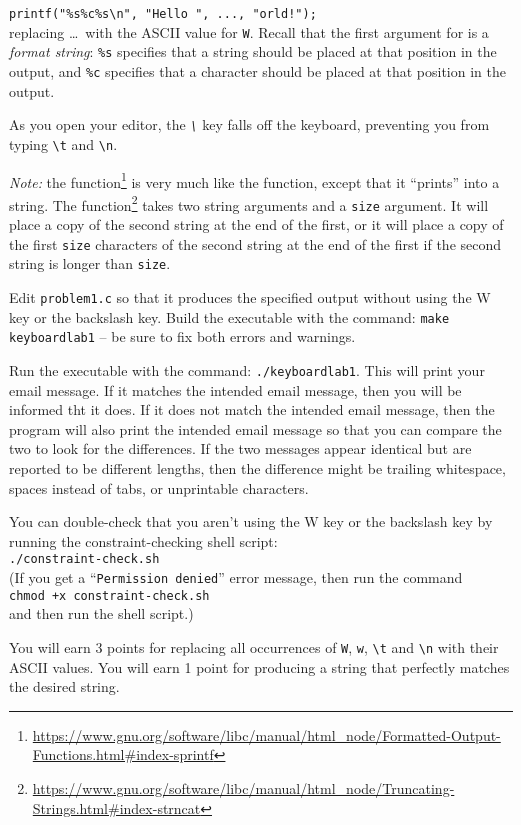 \lstinline{printf("%s%c%s\n", "Hello ", ..., "orld!");} \\
replacing \dots\ with the ASCII value for \texttt{W}.
Recall that the first argument for  is a \textit{format string}: \texttt{\%s} specifies that a string should be placed at that position in the output, and \texttt{\%c} specifies that a character should be placed at that position in the output.

As you open your editor, the \textit{\texttt{\textbackslash}} key falls off the keyboard, preventing you from typing \texttt{\textbackslash t} and \texttt{\textbackslash n}.

\textit{Note: } the  function\footnote{\url{https://www.gnu.org/software/libc/manual/html_node/Formatted-Output-Functions.html\#index-sprintf}} is very much like the  function, except that it ``prints'' into a string.
The  function\footnote{\url{https://www.gnu.org/software/libc/manual/html_node/Truncating-Strings.html\#index-strncat}} takes two string arguments and a \lstinline{size} argument.
It will place a copy of the second string at the end of the first, or it will place a copy of the first \lstinline{size} characters of the second string at the end of the first if the second string is longer than \lstinline{size}.

Edit \texttt{problem1.c} so that it produces the specified output without using the W key or the backslash key.
Build the executable with the command: \texttt{make keyboardlab1} -- be sure to fix both errors and warnings.

Run the executable with the command: \texttt{./keyboardlab1}.
This will print your email message.
If it matches the intended email message, then you will be informed tht it does.
If it does not match the intended email message, then the program will also print the intended email message so that you can compare the two to look for the differences.
If the two messages appear identical but are reported to be different lengths, then the difference might be trailing whitespace, spaces instead of tabs, or unprintable characters.

You can double-check that you aren't using the W key or the backslash key by running the constraint-checking shell script: \\
\texttt{./constraint-check.sh} \\
(If you get a ``\texttt{Permission denied}'' error message, then run the command \\
\texttt{chmod +x constraint-check.sh} \\
and then run the shell script.)

You will earn 3 points for replacing all occurrences of \texttt{W}, \texttt{w}, \texttt{\textbackslash t} and \texttt{\textbackslash n} with their ASCII values.
You will earn 1 point for producing a string that perfectly matches the desired string.

